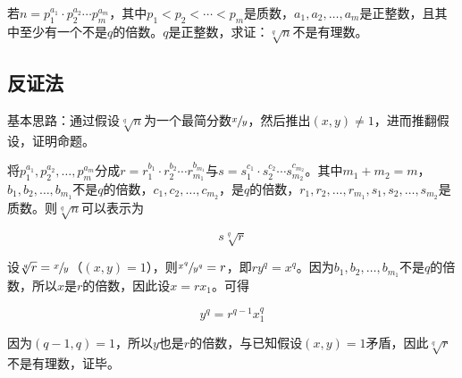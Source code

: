 

若$n = p_1^{a_1}\cdot p_2^{a_2} \cdots p_m^{a_m}$，其中$p_1 < p_2 <\cdots< p_m$是质数，$a_1, a_2,\dots,a_m$是正整数，且其中至少有一个不是$q$的倍数。$q$是正整数，求证：$\sqrt[q]{n}$不是有理数。

\subsection{反证法}

基本思路：通过假设$\sqrt[q]{n}$为一个最简分数$\sfrac xy$，然后推出$(x, y) \neq1$，进而推翻假设，证明命题。

将$p_1^{a_1}, p_2^{a_2}, \dots, p_m^{a_m}$分成$r = r_1^{b_1}\cdot r_2^{b_2} \cdots r_{m_1}^{b_{m_1}}$与$s = s_1^{c_1}\cdot s_2^{c_2} \cdots s_{m_2}^{c_{m_2}}$。其中$m_1 + m_2 = m$，$b_1, b_2, \dots, b_{m_1}$不是$q$的倍数，$c_1, c_2, \dots, c_{m_2}$，是$q$的倍数，$r_1, r_2, \dots, r_{m_1}, s_1, s_2, \dots, s_{m_2}$是质数。则$\sqrt[q]{n}$可以表示为

\[ s\sqrt[q]{r} \]

设$\sqrt[q]{r} = \sfrac xy$（$(x, y) = 1$），则$\sfrac{x^q}{y^q} = r$，即$ry^q = x^q$。因为$b_1, b_2, \dots, b_{m_1}$不是$q$的倍数，所以$x$是$r$的倍数，因此设$x = rx_1$。可得

\[ y^q = r^{q-1} x_1^q \]

因为$(q-1, q) = 1$，所以$y$也是$r$的倍数，与已知假设$(x, y) = 1$矛盾，因此$\sqrt[q]{r}$不是有理数，证毕。
